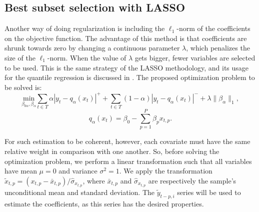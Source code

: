 \subsection{Best subset selection with LASSO}
\label{sec:best-subset-ell1}

Another way of doing regularization is including the $\ell_1$-norm of the coefficients on the objective function. The advantage of this method is that coefficients are shrunk towards zero by changing a continuous parameter $\lambda$, which penalizes the size of the $\ell_1$-norm.  
When the value of $\lambda$ gets bigger, fewer variables are selected to be used. 
This is the same strategy of the LASSO methodology, and its usage for the quantile regression is discussed in \cite{li2012l1}.
The proposed optimization problem to be solved is:
\begin{equation}
\underset{\beta_{0\alpha},\beta_\alpha}{\text{min}} \sum_{t \in T}\alpha|y_{t}-q_\alpha(x_t)|^{+}+ \sum_{t \in T}(1-\alpha)|y_{t}-q_\alpha(x_t)|^{-}+\lambda\|\beta_\alpha\|_{1},
\label{eq:l1-qar-optim}
\end{equation}
\[
q_\alpha(x_t)=\beta_{0}-\sum_{p=1}^{P}\beta_{p}x_{t,p}.
\]

For such estimation to be coherent, however, each covariate must have the same relative weight in comparison with one another. 
So, before solving the optimization problem, we perform a linear transformation such that all variables have mean $\mu = 0$ and variance $\sigma^2 = 1$. 
We apply the transformation $\tilde{x}_{t,p} = (x_{t,p} - \bar{x}_{t,p}) / \hat\sigma_{x_{t,p}}$, where $\bar{x}_{t,p}$ and $\hat{\sigma}_{x_{t,p}}$ are respectively the sample's unconditional mean and standard deviation. The $\tilde{y}_{t-p,i}$ series will be used to estimate the coefficients, as this series has the desired properties. 

